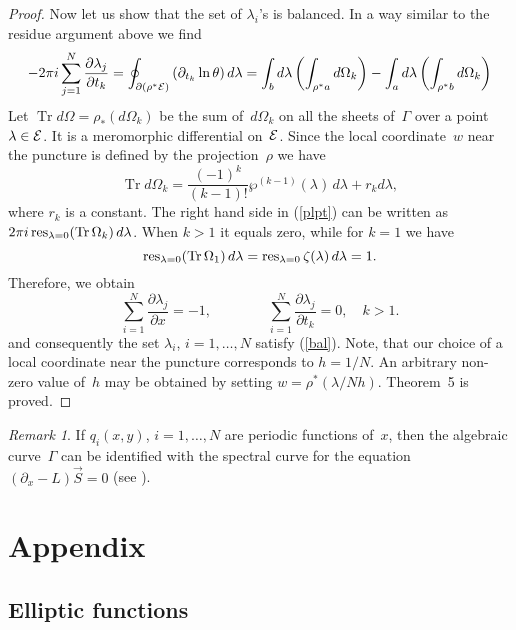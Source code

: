 \documentclass[a4paper,11pt]{article}
\newcommand{\p}{\partial}
\newcommand{\cE}{{\cal E}}
\newcommand{\vS}{\Vec{S}}
\DeclareMathOperator{\Tr}{Tr}
\newcommand{\res}{\mathop{\rm res}\nolimits}
\theoremstyle{plain}
\theoremstyle{remark}
\newtheorem*{rem}{Remark}
\begin{document}
\begin{proof}
Now let us show that the set of $\lambda_i$'s is balanced.
In a way similar to the residue argument above we find
\begin{equation}\label{plpt}
-2\pi i\sum_{j=1}^N \frac{\p \lambda_j}{\p t_k}=
\oint_{\p (\rho^*\cE)} \left(\p_{t_k}\ln \theta\right) d\lambda=
\int_{b}d\lambda\left(\int_{\rho^*a}d\Omega_k\right)-
\int_{a}d\lambda\left(\int_{\rho^*b}d\Omega_k\right)
\end{equation}
Let $\Tr d\Omega=\rho_*(d\Omega_k)$ be the sum of~$d\Omega_k$ on all the
sheets of~$\Gamma$ over a point $\lambda\in \cE$. It is a meromorphic
differential on~$\cE$. Since the local coordinate~$w$ near the puncture
is defined by the projection~$\rho$ we have
\begin{equation}
\Tr d\Omega_k=\frac{(-1)^{k}}{(k-1)!} \wp^{(k-1)}(\lambda)\,d\lambda
+r_k d\lambda,
\end{equation}
where $r_k$ is a constant.
The right hand side in (\ref{plpt}) can be written as
$2\pi i \res_{\lambda=0} (\Tr \Omega_k)\,d\lambda$.
When $k>1$ it equals zero, while for $k=1$ we have
$$
\res_{\lambda=0} (\Tr\Omega_1)\,d\lambda=
\res_{\lambda=0} \zeta(\lambda)\,d\lambda=1 .
$$
Therefore, we obtain
\begin{equation}
\sum_{i=1}^N \frac{\p\lambda_j}{\p x}=-1,\qquad\qquad
\sum_{i=1}^N \frac{\p\lambda_j}{\p t_k}=0,\quad k>1 .
\end{equation}
and consequently the set $\lambda_i$, $i=1,\dots, N$ satisfy (\ref{bal}).
Note, that our choice of a local coordinate near the puncture corresponds
to $h=1/N$. An arbitrary non-zero value of~$h$ may be obtained by setting
$w=\rho^{*}(\lambda/N h)$.
Theorem~5 is proved.
\end{proof}

\begin{rem}
If $q_i(x,y)$, $i=1,\dots,N$ are periodic functions of~$x$,
then the algebraic curve~$\Gamma$ can be identified with the spectral
curve for the equation $(\p_x- L)\vS=0$ (see \cite{krvb}).
\end{rem}

\appendix
\section{Appendix}
\subsection{Elliptic functions}
\end{document}
